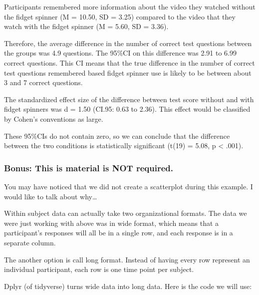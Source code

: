 \documentclass[
]{book}
\newenvironment{Shaded}{\begin{snugshade}}{\end{snugshade}}
\newcommand{\DataTypeTok}[1]{\textcolor[rgb]{0.13,0.29,0.53}{#1}}
\newcommand{\KeywordTok}[1]{\textcolor[rgb]{0.13,0.29,0.53}{\textbf{#1}}}
\newcommand{\NormalTok}[1]{#1}
\newcommand{\OperatorTok}[1]{\textcolor[rgb]{0.81,0.36,0.00}{\textbf{#1}}}
\newcommand{\StringTok}[1]{\textcolor[rgb]{0.31,0.60,0.02}{#1}}
\begin{document}
Participants remembered more information about the video they watched without the fidget spinner (M = 10.50, SD = 3.25) compared to the video that they watch with the fidget spinner (M = 5.60, SD = 3.36).

Therefore, the average difference in the number of correct test questions between the groups was 4.9 questions. The 95\%CI on this difference was 2.91 to 6.99 correct questions. This CI means that the true difference in the number of correct test questions remembered based fidget spinner use is likely to be between about 3 and 7 correct questions.

The standardized effect size of the difference between test score without and with fidget spinners was d = 1.50 (CI.95: 0.63 to 2.36). This effect would be classified by Cohen's conventions as large.

These 95\%CIs do not contain zero, so we can conclude that the difference between the two conditions is statistically significant (t(19) = 5.08, p \textless{} .001).

\hypertarget{bonus-this-is-material-is-not-required.}{%
\subsubsection{Bonus: This is material is NOT required.}\label{bonus-this-is-material-is-not-required.}}

You may have noticed that we did not create a scatterplot during this example. I would like to talk about why\ldots{}

Within subject data can actually take two organizational formats. The data we were just working with above was in wide format, which means that a participant's responses will all be in a single row, and each response is in a separate column.

The another option is call long format. Instead of having every row represent an individual participant, each row is one time point per subject.

Dplyr (of tidyverse) turns wide data into long data. Here is the code we will use:

\begin{Shaded}
\end{Shaded}
\end{document}
